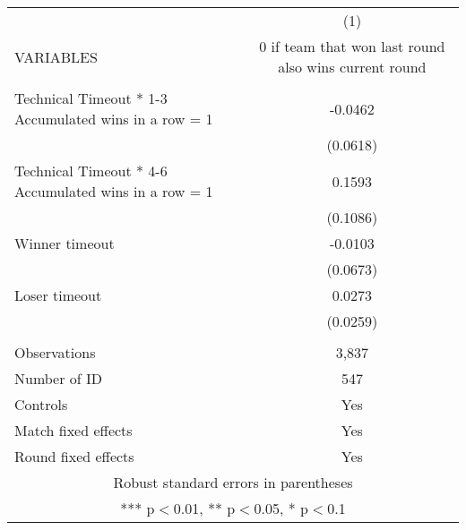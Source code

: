 \documentclass[]{article}
\begin{document}
\begin{tabular}{lc} \hline
 & (1) \\
VARIABLES & 0 if team that won last round also wins current round \\ \hline
 &  \\
Technical Timeout * 1-3 Accumulated wins in a row = 1 & -0.0462 \\
 & (0.0618) \\
Technical Timeout * 4-6 Accumulated wins in a row = 1 & 0.1593 \\
 & (0.1086) \\
Winner timeout & -0.0103 \\
 & (0.0673) \\
Loser timeout & 0.0273 \\
 & (0.0259) \\
 &  \\
Observations & 3,837 \\
Number of ID & 547 \\
Controls & Yes \\
Match fixed effects & Yes \\
 Round fixed effects & Yes \\ \hline
\multicolumn{2}{c}{ Robust standard errors in parentheses} \\
\multicolumn{2}{c}{ *** p$<$0.01, ** p$<$0.05, * p$<$0.1} \\
\end{tabular}
\end{document}
